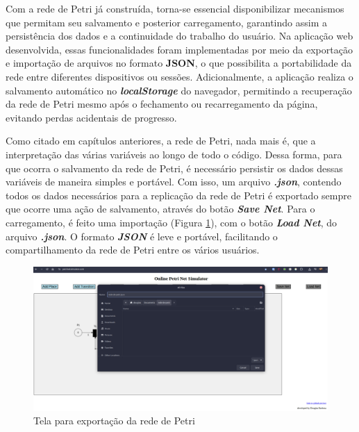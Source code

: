 \documentclass[
	12pt,				%
	openright,			%
	oneside,			%
	a4paper,			%
	english,			%
	brazil				%
	]{abntex2}
\theoremstyle{doispontos}
\begin{document}
Com a rede de Petri já construída, torna-se essencial disponibilizar mecanismos que permitam seu salvamento e posterior carregamento, garantindo assim a persistência dos dados e a continuidade do trabalho do usuário. Na aplicação web desenvolvida, essas funcionalidades foram implementadas por meio da exportação e importação de arquivos no formato \textbf{JSON}, o que possibilita a portabilidade da rede entre diferentes dispositivos ou sessões. Adicionalmente, a aplicação realiza o salvamento automático no \textbf{\textit{localStorage}} do navegador, permitindo a recuperação da rede de Petri mesmo após o fechamento ou recarregamento da página, evitando perdas acidentais de progresso.

Como citado em capítulos anteriores, a rede de Petri, nada mais é, que a interpretação das várias variáveis ao longo de todo o código. Dessa forma, para que ocorra o salvamento da rede de Petri, é necessário persistir os dados dessas variáveis de maneira simples e portável. Com isso, um arquivo \textbf{\textit{.json}}, contendo todos os dados necessários para a replicação da rede de Petri é exportado sempre que ocorre uma ação de salvamento, através do botão \textbf{\textit{Save Net}}. Para o carregamento, é feito uma importação (Figura \ref{fig:saveNet}), com o botão \textbf{\textit{Load Net}}, do arquivo \textbf{\textit{.json}}. O formato \textbf{\textit{JSON}} é leve e portável, facilitando o compartilhamento da rede de Petri entre os vários usuários.   

\begin{figure}[ht] 
	\centering
	\includegraphics[scale=0.3]{figuras/saveNet.png}
	\caption[Tela para exportação da rede de Petri]{Tela para exportação da rede de Petri}
	\label{fig:saveNet}
\end{figure}
\FloatBarrier
\end{document}
